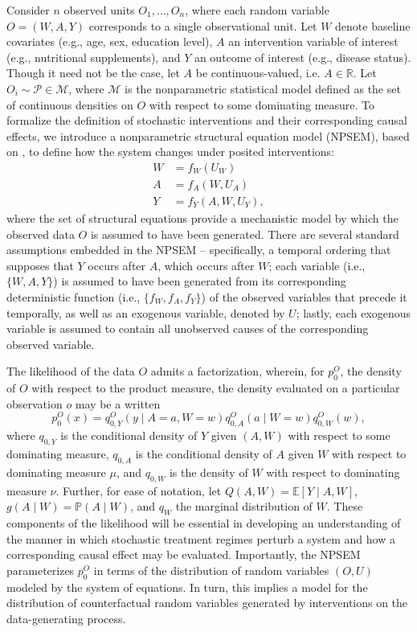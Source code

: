 \documentclass[12pt, krantz2,]{krantz}
\theoremstyle{definition}
\theoremstyle{definition}
\theoremstyle{definition}
\renewcommand{\P}{\mathbb{P}}
\newcommand{\R}{\mathbb{R}}
\newcommand{\E}{\mathbb{E}}
\newcommand{\M}{\mathcal{M}}
\newcommand{\1}{\mathbbm{1}}
\begin{document}
Consider \(n\) observed units \(O_1, \ldots, O_n\), where each random variable \(O = (W, A, Y)\) corresponds to a single observational unit. Let \(W\) denote baseline
covariates (e.g., age, sex, education level), \(A\) an intervention variable of
interest (e.g., nutritional supplements), and \(Y\) an outcome of interest (e.g.,
disease status). Though it need not be the case, let \(A\) be continuous-valued,
i.e. \(A \in \R\). Let \(O_i \sim \mathcal{P} \in \M\), where \(\M\) is the
nonparametric statistical model defined as the set of continuous densities on
\(O\) with respect to some dominating measure. To formalize the definition of
stochastic interventions and their corresponding causal effects, we introduce a
nonparametric structural equation model (NPSEM), based on \citet{pearl2009causality},
to define how the system changes under posited interventions:
\begin{align}
  W &= f_W(U_W) \\ A &= f_A(W, U_A) \\ Y &= f_Y(A, W, U_Y),
  \label{eq:npsem-shift}
\end{align}
where the set of structural equations provide a mechanistic model by which the
observed data \(O\) is assumed to have been generated. There are several standard
assumptions embedded in the NPSEM -- specifically, a temporal ordering that
supposes that \(Y\) occurs after \(A\), which occurs after \(W\); each variable (i.e.,
\(\{W, A, Y\}\)) is assumed to have been generated from its corresponding
deterministic function (i.e., \(\{f_W, f_A, f_Y\}\)) of the observed variables
that precede it temporally, as well as an exogenous variable, denoted by \(U\);
lastly, each exogenous variable is assumed to contain all unobserved causes of
the corresponding observed variable.

The likelihood of the data \(O\) admits a factorization, wherein, for \(p_0^O\),
the density of \(O\) with respect to the product measure, the density evaluated
on a particular observation \(o\) may be a written
\begin{equation}
  p_0^O(x) = q^O_{0,Y}(y \mid A = a, W = w) q^O_{0,A}(a \mid W = w)
  q^O_{0,W}(w),
  \label{eq:likelihood-factorization-shift}
\end{equation}
where \(q_{0, Y}\) is the conditional density of \(Y\) given \((A, W)\) with respect
to some dominating measure, \(q_{0, A}\) is the conditional density of \(A\) given
\(W\) with respect to dominating measure \(\mu\), and \(q_{0, W}\) is the density of
\(W\) with respect to dominating measure \(\nu\). Further, for ease of notation, let
\(Q(A, W) = \E[Y \mid A, W]\), \(g(A \mid W) = \P(A \mid W)\), and \(q_W\) the
marginal distribution of \(W\). These components of the likelihood will be
essential in developing an understanding of the manner in which stochastic
treatment regimes perturb a system and how a corresponding causal effect may be
evaluated. Importantly, the NPSEM parameterizes \(p_0^O\) in terms of the
distribution of random variables \((O, U)\) modeled by the system of equations. In
turn, this implies a model for the distribution of counterfactual random
variables generated by interventions on the data-generating process.
\end{document}
